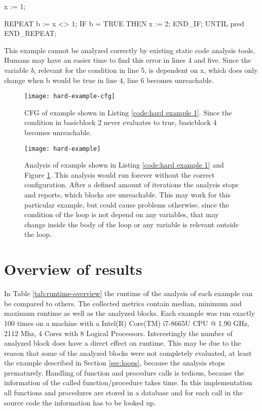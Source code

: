 \begin{program}[h!]
	\begin{GenericCode}
x := 1;
	
REPEAT
	b := x <> 1;
	IF b = TRUE THEN
		x := 2;
	END_IF;    
UNTIL pred
END_REPEAT;	\end{GenericCode}
	\centering
	\caption{This example cannot be analyzed correctly by existing static code analysis tools. Humans may have an easier time to find this error in lines 4 and five. Since the variable \emph{b}, relevant for the condition in line 5, is dependent on x, which does only change when b would be true in line 4, line 6 becomes unreachable. }
	\label{code:hard example 1}	
\end{program}

\begin{figure}[hbt!]
	\centering
	\texttt{[image: hard-example-cfg]}
	\caption{CFG of example shown in Listing \ref{code:hard example 1}. Since the condition in basicblock 2 never evaluates to true, basicblock 4 becomes unreachable.}
	\label{fig:hard example 1}
\end{figure}
\begin{figure}[hbt!]
	\centering
	\texttt{[image: hard-example]}
	\caption{Analysis of example shown in Listing \ref{code:hard example 1} and Figure \ref{fig:hard example 1}. This analysis would run forever without the correct configuration. After a defined amount of iterations the analysis stops and reports, which blocks are unreachable. This may work for this particular example, but could cause problems otherwise, since the condition of the loop is not depend on any variables, that may change inside the body of the loop or any variable is relevant outside the loop.}
	\label{fig:hard example 1 cfg}
\end{figure}

\section{Overview of results}
\label{sec:overview of results}
In Table \ref{tab:runtime-overview} the runtime of the analysis of each example can be compared to others. The collected metrics contain median, minimum and maximum runtime as well as the analyzed blocks. 
Each example was run exactly 100 times on a machine with a Intel(R) Core(TM) i7-8665U CPU @ 1.90 GHz, 2112 Mhz, 4 Cores with 8 Logical Processors. 
Interestingly the number of analyzed block does have a direct effect on runtime. This may be due to the reason that some of the analyzed blocks were not completely evaluated, at least the example described in Section \ref{sec:loops}, because the analysis stops prematurely. Handling of function and procedure calls is tedious, because the information of the called function/procedure takes time. In this implementation all functions and procedures are stored in a database and for each call in the source code the information has to be looked up.

